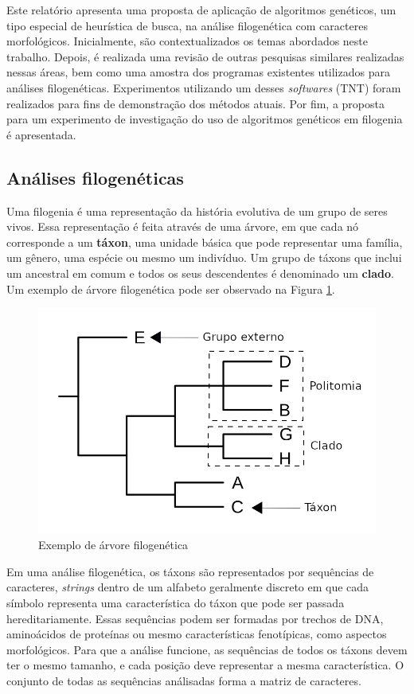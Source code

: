 \documentclass[12pt]{article}
\begin{document}
Este relatório apresenta uma proposta de aplicação de algoritmos genéticos, um tipo especial de heurística de busca, na análise filogenética com caracteres morfológicos. Inicialmente, são contextualizados os temas abordados neste trabalho. Depois, é realizada uma revisão de outras pesquisas similares realizadas nessas áreas, bem como uma amostra dos programas existentes utilizados para análises filogenéticas. Experimentos utilizando um desses \emph{softwares} (TNT) foram realizados para fins de demonstração dos métodos atuais. Por fim, a proposta para um experimento de investigação do uso de algoritmos genéticos em filogenia é apresentada.

\subsection{Análises filogenéticas}
Uma filogenia é uma representação da história evolutiva de um grupo de seres vivos. Essa representação é feita através de uma árvore, em que cada nó corresponde a um \textbf{táxon}, uma unidade básica que pode representar uma família, um gênero, uma espécie ou mesmo um indivíduo. Um grupo de táxons que inclui um ancestral em comum e todos os seus descendentes é denominado um \textbf{clado}. Um exemplo de árvore filogenética pode ser observado na Figura \ref{fig:phylogeny}.

\begin{figure}[ht]
  \centering
  \includegraphics[width=.8\textwidth]{img/phylogeny}
  \caption{Exemplo de árvore filogenética}
  \label{fig:phylogeny}
\end{figure}

Em uma análise filogenética, os táxons são representados por sequências de caracteres, \emph{strings} dentro de um alfabeto geralmente discreto em que cada símbolo representa uma característica do táxon que pode ser passada hereditariamente. Essas sequências podem ser formadas por trechos de DNA, aminoácidos de proteínas ou mesmo características fenotípicas, como aspectos morfológicos. Para que a análise funcione, as sequências de todos os táxons devem ter o mesmo tamanho, e cada posição deve representar a mesma característica. O conjunto de todas as sequências análisadas forma a matriz de caracteres.
\end{document}
